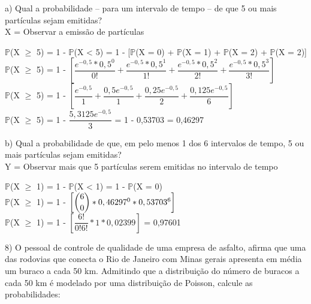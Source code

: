 \documentclass[12pt,a4paper]{article}
\begin{document}
	a) Qual a probabilidade – para um intervalo de tempo – de que 5 ou mais partículas sejam emitidas?
	\vspace{0.5cm}\\
	X = Observar a emissão de partículas
	\begin{center}
		\vspace{0.5cm}
		$\mathbb{P}$(X $\geq$ 5) = 1 - $\mathbb{P}$(X < 5) = 1 - [$\mathbb{P}$(X = 0) + $\mathbb{P}$(X = 1) + $\mathbb{P}$(X = 2) + $\mathbb{P}$(X = 2)]
		\vspace{0.5cm}\\
		$\mathbb{P}$(X $\geq$ 5) = 1 - $\left[\dfrac{e^{-0,5} * 0,5^0}{0!} + \dfrac{e^{-0,5} * 0,5^1}{1!} + \dfrac{e^{-0,5} * 0,5^2}{2!} + \dfrac{e^{-0,5} * 0,5^3}{3!}\right]$
		\vspace{0.5cm}\\
		$\mathbb{P}$(X $\geq$ 5) = 1 - $\left[\dfrac{e^{-0,5}}{1} + \dfrac{0,5e^{-0,5}}{1} + \dfrac{0,25e^{-0,5}}{2} + \dfrac{0,125e^{-0,5}}{6}\right]$
		\vspace{0.5cm}\\
		$\mathbb{P}$(X $\geq$ 5) = 1 - $\dfrac{5,3125e^{-0,5}}{3}$ = 1 - 0,53703 = 0,46297
	\end{center}
	\vspace{1cm}
	b) Qual a probabilidade de que, em pelo menos 1 dos 6 intervalos de
	tempo, 5 ou mais partículas sejam emitidas?
	\vspace{0.5cm}\\
	Y = Observar mais que 5 partículas serem emitidas no intervalo de tempo
	\begin{center}
		\vspace{0.5cm}
		$\mathbb{P}$(X $\geq$ 1) = 1 -	$\mathbb{P}$(X < 1) = 1 -	$\mathbb{P}$(X = 0)
		\vspace{0.5cm}\\
		$\mathbb{P}$(X $\geq$ 1) = 1 - $\left[\dbinom{6}{0} * 0,46297^{0} * 0,53703^{6}\right]$ 
		\vspace{0.5cm}\\
		$\mathbb{P}$(X $\geq$ 1) = 1 - $\left[\dfrac{6!}{0!6!} * 1 * 0,02399\right]$ = 0,97601
	\end{center}
	\vspace{1cm}
	8) O pessoal de controle de qualidade de uma empresa de asfalto, afirma que uma das rodovias que conecta o Rio de Janeiro com Minas gerais apresenta em média um buraco a cada 50 km. Admitindo que a distribuição do número de buracos a	cada 50 km é modelado por uma distribuição de Poisson, calcule as	probabilidades:\\
\end{document}
